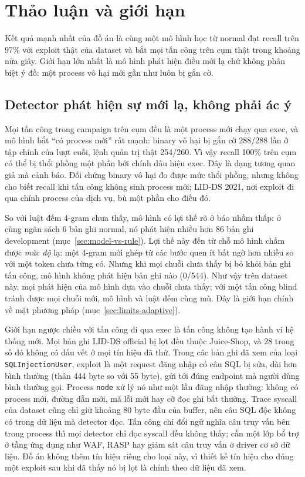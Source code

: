 \chapter{Thảo luận và giới hạn}

Kết quả mạnh nhất của đồ án là cùng một mô hình học từ normal đạt recall trên 97\% với exploit thật của dataset và bắt mọi tấn công trên cụm thật trong khoảng nửa giây. Giới hạn lớn nhất là mô hình phát hiện điều mới lạ chứ không phân biệt ý đồ: một process vô hại mới gần như luôn bị gắn cờ.

\section{Detector phát hiện sự mới lạ, không phải ác ý}\label{sec:limits-novelty}

Mọi tấn công trong campaign trên cụm đều là một process mới chạy qua exec, và mô hình bắt ``có process mới'' rất mạnh: binary vô hại bị gắn cờ 288/288 lần ở tập chính của lượt cuối, lệnh quản trị thật 254/260. Vì vậy recall 100\% trên cụm có thể bị thổi phồng một phần bởi chính dấu hiệu exec. Đây là dạng tương quan giả mà \citet{arp2022} cảnh báo. Đối chứng binary vô hại đo được mức thổi phồng, nhưng không cho biết recall khi tấn công không sinh process mới; LID-DS 2021, nơi exploit đi qua chính process của dịch vụ, bù một phần cho điều đó.

So với luật đếm 4-gram chưa thấy, mô hình có lợi thế rõ ở báo nhầm thấp: ở cùng ngân sách 6 bản ghi normal, nó phát hiện nhiều hơn 86 bản ghi development (mục~\ref{sec:model-vs-rule}). Lợi thế này đến từ chỗ mô hình chấm được \emph{mức độ} lạ: một 4-gram mới ghép từ các bước quen ít bất ngờ hơn nhiều so với một token chưa từng có. Nhưng khi mọi chuỗi chưa thấy bị bỏ khỏi bản ghi tấn công, mô hình không phát hiện bản ghi nào (0/544). Như vậy trên dataset này, mọi phát hiện của mô hình dựa vào chuỗi chưa thấy; với một tấn công blind tránh được mọi chuỗi mới, mô hình và luật đếm cùng mù. Đây là giới hạn chính về mặt phương pháp (mục~\ref{sec:limits-adaptive}).

Giới hạn ngược chiều với tấn công đi qua exec là tấn công không tạo hành vi hệ thống mới. Mọi bản ghi LID-DS official bị lọt đều thuộc Juice-Shop, và 28 trong số đó không có dấu vết ở mọi tín hiệu đã thử. Trong các bản ghi đã xem của loại \texttt{SQLInjectionUser}, exploit là một request đăng nhập có câu SQL bị sửa, dài hơn bình thường (thân 444 byte so với 55 byte), gửi tới đúng endpoint mà người dùng bình thường gọi. Process \texttt{node} xử lý nó như một lần đăng nhập thường: không có process mới, đường dẫn mới, mã lỗi mới hay cỡ đọc ghi bất thường. Trace syscall của dataset cũng chỉ giữ khoảng 80 byte đầu của buffer, nên câu SQL độc không có trong dữ liệu mà detector đọc. Tấn công chỉ đổi ngữ nghĩa câu truy vấn bên trong process thì mọi detector chỉ đọc syscall đều không thấy; cần một lớp bổ trợ ở tầng ứng dụng như WAF, RASP hay giám sát câu truy vấn ở driver cơ sở dữ liệu. Đồ án không thêm tín hiệu riêng cho loại này, vì thiết kế tín hiệu cho đúng một exploit sau khi đã thấy nó bị lọt là chỉnh theo dữ liệu đã xem.

